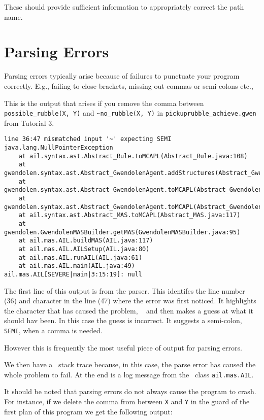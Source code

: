 \documentclass[a4]{article}
\begin{document}
These should provide sufficient information to appropriately correct the path name.

\section{Parsing Errors}

Parsing errors typically arise because of failures to punctuate your program correctly.  E.g., failing to close brackets, missing out commas or semi-colons etc.,

This is the output that arises if you remove the comma between \lstinline{possible_rubble(X, Y)} and \lstinline{~no_rubble(X, Y)} in \texttt{pickuprubble\_achieve.gwen} from Tutorial 3.

\begin{verbatim}
line 36:47 mismatched input '~' expecting SEMI
java.lang.NullPointerException
	at ail.syntax.ast.Abstract_Rule.toMCAPL(Abstract_Rule.java:108)
	at gwendolen.syntax.ast.Abstract_GwendolenAgent.addStructures(Abstract_GwendolenAgent.java:90)
	at gwendolen.syntax.ast.Abstract_GwendolenAgent.toMCAPL(Abstract_GwendolenAgent.java:77)
	at gwendolen.syntax.ast.Abstract_GwendolenAgent.toMCAPL(Abstract_GwendolenAgent.java:48)
	at ail.syntax.ast.Abstract_MAS.toMCAPL(Abstract_MAS.java:117)
	at gwendolen.GwendolenMASBuilder.getMAS(GwendolenMASBuilder.java:95)
	at ail.mas.AIL.buildMAS(AIL.java:117)
	at ail.mas.AIL.AILSetup(AIL.java:80)
	at ail.mas.AIL.runAIL(AIL.java:61)
	at ail.mas.AIL.main(AIL.java:49)
ail.mas.AIL[SEVERE|main|3:15:19]: null 
\end{verbatim}

The first line of this output is from the parser.  This identifes the line number (36) and character in the line (47) where the error was first noticed.  It highlights the character that has caused the problem, \texttt{~} and then makes a guess at what it should hav been.  In this case the guess is incorrect.  It suggests a semi-colon, \texttt{SEMI}, when a comma is needed.

However this is frequently the most useful piece of output for parsing errors.

We then have a \java\ stack trace because, in this case, the parse error has caused the whole problem to fail.  At the end is a log message from the \java\ class \texttt{ail.mas.AIL}.

It should be noted that parsing errors do not always cause the program to crash.  For instance, if we delete the comma from between \texttt{X} and \texttt{Y} in the guard of the first plan of this program we get the following output:
\end{document}
